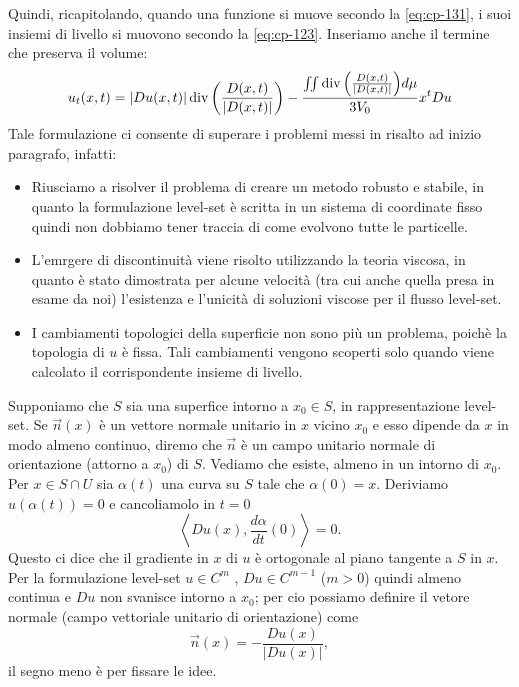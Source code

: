 Quindi, ricapitolando, quando una funzione si muove secondo la \eqref{eq:cp-131}, i suoi insiemi di livello si muovono secondo la \eqref{eq:cp-123}. Inseriamo anche il termine che preserva il volume:
\begin{equation}
  \label{eq:cp-132}
  u_t(x,t)=|Du(x,t)|\operatorname{div}{\left(\frac{D(x,t)}{|D(x,t)|}\right)}-\frac{\iint\operatorname{div}{\left(\frac{D(x,t)}{|D(x,t)|}\right)}d\mu}{3V_0}x^tDu
\end{equation}
 Tale formulazione ci consente di superare i problemi messi in risalto ad inizio paragrafo, infatti:
\begin{itemize}
  \item Riusciamo a risolver il problema di creare un metodo robusto e stabile, in quanto la formulazione level-set è scritta in un sistema di coordinate fisso quindi non dobbiamo tener traccia di come evolvono tutte le particelle.

  \item L'emrgere di discontinuità viene risolto utilizzando la teoria viscosa, in quanto è stato dimostrata per alcune velocità (tra cui anche quella presa in esame da noi) l'esistenza e l'unicità di soluzioni viscose per il flusso level-set.

   \item I cambiamenti topologici della superficie non sono più un problema, poichè la topologia di $u$ è fissa. Tali cambiamenti vengono scoperti solo quando viene calcolato il corrispondente insieme di livello. 

\end{itemize}

\begin{osservazione}
\label{oss:cp-131}
Supponiamo che $S$ sia una superfice intorno a $x_0\in S$, in rappresentazione level-set. Se $\vec{n}(x)$ è un vettore normale unitario in $x$ vicino $x_0$ e esso dipende da $x$ in modo almeno continuo, diremo che $\vec{n}$ è un campo unitario normale di orientazione (attorno a $x_0$) di $S$. Vediamo che esiste, almeno in un intorno di $x_0$. Per $x\in S\cap U$ sia $\alpha(t)$ una curva su $S$ tale che $\alpha(0)=x$. Deriviamo $u(\alpha(t)) = 0$ e cancoliamolo in $t=0$
\[
\left<Du(x),\frac{d\alpha}{dt}(0)\right> = 0.
\]
Questo ci dice che il gradiente in $x$ di $u$ è ortogonale al piano tangente a $S$ in $x$. Per la formulazione level-set $u\in C^m$ , $Du\in C^{m-1}$ ($m>0$) quindi almeno continua e $Du$ non svanisce intorno a $x_0$; per cio possiamo definire il vetore normale (campo vettoriale unitario di orientazione) come
\[
\vec{n}(x)=-\frac{Du(x)}{|Du(x)|},
\]
il segno meno è per fissare le idee.
\end{osservazione}
